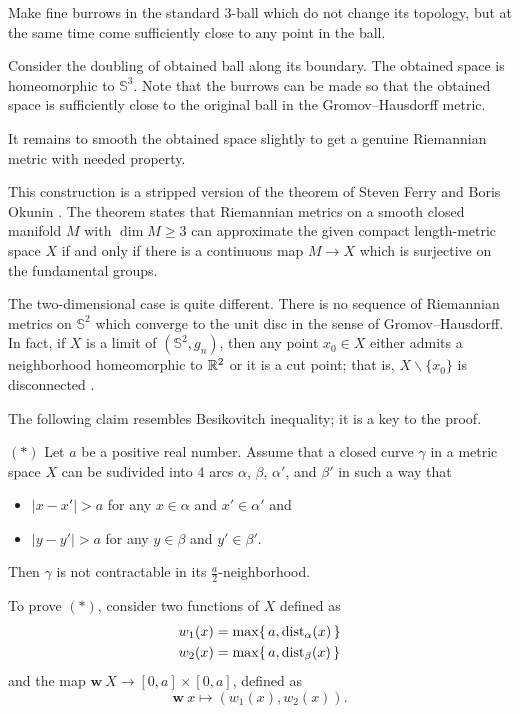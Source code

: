 Make fine burrows in the standard 3-ball which do not change its topology,
but at the same time come sufficiently close to any point in the ball.

Consider the doubling of obtained ball along  its boundary.
The obtained space is homeomorphic to $\mathbb{S}^3$.
Note that the burrows can be made 
so that the obtained space is sufficiently close to the original ball 
in the Gromov--Hausdorff metric.

It remains to smooth the obtained space slightly 
to get a genuine Riemannian metric with needed property.\qeds


This construction is a stripped version of the theorem of Steven Ferry and Boris Okunin \cite[see][]{ferry-okun}.
The theorem states that Riemannian metrics on a smooth closed manifold $M$ with $\dim M\ge 3$ 
can approximate the given compact length-metric space $X$ 
if and only if 
there is a continuous map $M\to X$
which is surjective on the fundamental groups. 

The two-dimensional case is quite different.
There is no sequence of Riemannian metrics on
$\mathbb{S}^2$ which converge to the unit disc in the sense of Gromov--Hausdorff.
In fact, 
if $X$ is a limit of $(\mathbb{S}^2,g_n)$,
then any point $x_0\in X$ either admits a neighborhood homeomorphic to $\mathbb{R}^2$ or it is a cut point;
that is, $X\backslash\{x_0\}$ is disconnected \cite[see 3.32 in][]{gromov-MetStr}.

The following claim resembles Besikovitch inequality;
it is a key to the proof.
\begin{cl}{$({*})$} Let $a$ be a positive real number.
 Assume that a closed curve $\gamma$ in a metric space $X$ can be sudivided into 4 arcs $\alpha$, $\beta$, $\alpha'$, and $\beta'$ in such a way that 
 \begin{itemize}
 \item $|x-x'|>a$ for any $x\in\alpha$ and $x'\in \alpha'$
 and
 \item $|y-y'|>a$ for any $y\in\beta$ and $y'\in \beta'$.
 \end{itemize}
 Then $\gamma$ is not contractable in its $\tfrac a2$-neighborhood.
\end{cl}


To prove $({*})$, consider two functions of $X$ defined as
\begin{align*}
w_1(x)&=\max\{\,a,\operatorname{\rm dist}\nolimits_{\alpha}(x)\,\}
\\
w_2(x)&=\max\{\,a,\operatorname{\rm dist}\nolimits_{\beta}(x)\,\}
\end{align*}
and the map $\bm{w}\:X\to [0,a]\times[0,a]$, defined as 
\[\bm{w}\:x\mapsto(w_1(x),w_2(x)).\]

